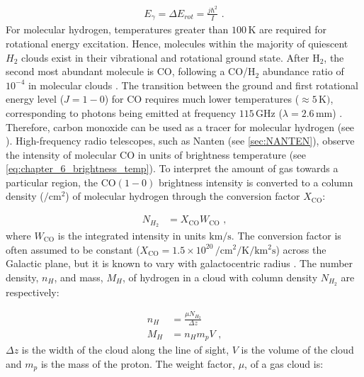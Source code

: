 \begin{equation}
    \begin{aligned}
        E_\gamma=\Delta E_{rot} = \frac{j\hbar^2}{I}\text{ .}
    \end{aligned}
\end{equation}
\noindent For molecular hydrogen, temperatures greater than $100\,\si{\kelvin}$ are required for rotational energy excitation. Hence, molecules within the majority of quiescent $H_2$ clouds exist in their vibrational and rotational ground state. 
\newpar 
After H$_2$, the second most abundant molecule is CO, following a  CO/H$_2$ abundance ratio of $10^{-4}$ in molecular clouds \citep{1994ApJ...428L..69L}. The transition between the ground and first rotational energy level ($J=1-0$) for CO requires much lower temperatures ($\approx 5\,\si{\kelvin})$, corresponding to photons being emitted at frequency $115\,\si{\giga\hertz}$ ($\lambda=2.6\,\si{\milli\meter}$) \citep{alma9927598238601811}. Therefore, carbon monoxide can be used as a tracer for molecular hydrogen (see \citep{Bolatto2013}).
\newpar
High-frequency radio telescopes, such as Nanten (see \autoref{sec:NANTEN}), observe the intensity of molecular CO in units of brightness temperature (see \autoref{eq:chapter_6_brightness_temp}). To interpret the amount of gas towards a particular region, the CO$(1-0)$ brightness intensity is converted to a column density ($\si{\per\centi\meter\squared}$) of molecular hydrogen through the conversion factor $X_\text{CO}$:

\begin{equation}
	\begin{aligned}
		N_{H_2}&=X_\text{CO}W_\text{CO}\text{ ,}
	\end{aligned}
\end{equation}
\noindent where $W_\text{CO}$ is the integrated intensity in units $\si{\kilo\meter\per\second}$. The conversion factor is often assumed to be constant ($X_\text{CO}=1.5\times 10^{20}\,\si{\per\centi\meter\squared\per\kelvin\per\kilo\meter\squared\second}$) across the Galactic plane, but it is known to vary with galactocentric radius \citep{2004A&A...422L..47S}. The number density, $n_H$, and mass, $M_H$, of hydrogen in a cloud with column density $N_{H_2}$ are respectively:

\begin{equation}
	\begin{aligned}
		n_H&=\frac{\mu N_{H_2}}{\Delta z} \label{eq:06_density_gas} \\
		M_H&=n_Hm_pV\text{ ,}
	\end{aligned}
\end{equation}
\noindent $\Delta z$ is the width of the cloud along the line of sight, $V$ is the volume of the cloud and $m_p$ is the mass of the proton. The weight factor, $\mu$, of a gas cloud is:

